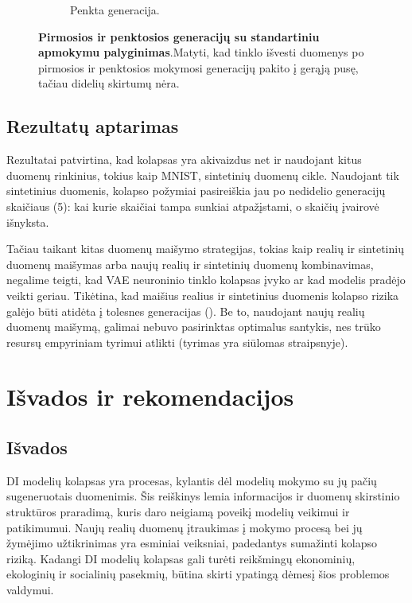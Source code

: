 \documentclass{VUMIFInfKursinis}
\begin{document}
\begin{figure}[H]
\begin{subfigure}[t]{0.45\textwidth}
        \caption{Penkta generacija.}
        \label{img:image2}
    \end{subfigure}
    \caption{\textbf{Pirmosios ir penktosios generacijų su standartiniu apmokymu palyginimas}.Matyti, kad tinklo išvesti duomenys po pirmosios ir penktosios mokymosi generacijų pakito į gerąją pusę, tačiau didelių skirtumų nėra.}
    \label{img:original_gen_1_5}
\end{figure}







\subsection{Rezultatų aptarimas}

Rezultatai patvirtina, kad kolapsas yra akivaizdus net ir naudojant kitus duomenų rinkinius, tokius kaip MNIST, sintetinių duomenų cikle. Naudojant tik sintetinius duomenis, kolapso požymiai pasireiškia jau po nedidelio generacijų skaičiaus (5): kai kurie skaičiai tampa sunkiai atpažįstami, o skaičių įvairovė išnyksta. 

Tačiau taikant kitas duomenų maišymo strategijas, tokias kaip realių ir sintetinių duomenų maišymas arba naujų realių ir sintetinių duomenų kombinavimas, negalime teigti, kad VAE neuroninio tinklo kolapsas įvyko ar kad modelis pradėjo veikti geriau. Tikėtina, kad maišius realius ir sintetinius duomenis kolapso rizika galėjo būti atidėta į tolesnes generacijas (\cite{AICollapseNature}). Be to, naudojant naujų realių duomenų maišymą, galimai nebuvo pasirinktas optimalus santykis, nes trūko resursų empyriniam tyrimui atlikti (tyrimas yra siūlomas \cite{DesniuPasiulymai} straipsnyje).



\section{Išvados ir rekomendacijos}

\subsection{Išvados}

DI modelių kolapsas yra procesas, kylantis dėl modelių mokymo su jų pačių sugeneruotais duomenimis. Šis reiškinys lemia informacijos ir duomenų skirstinio struktūros praradimą, kuris daro neigiamą poveikį modelių veikimui ir patikimumui. Naujų realių duomenų įtraukimas į mokymo procesą bei jų žymėjimo užtikrinimas yra esminiai veiksniai, padedantys sumažinti kolapso riziką. Kadangi DI modelių kolapsas gali turėti reikšmingų ekonominių, ekologinių ir socialinių pasekmių, būtina skirti ypatingą dėmesį šios problemos valdymui.
\end{document}
